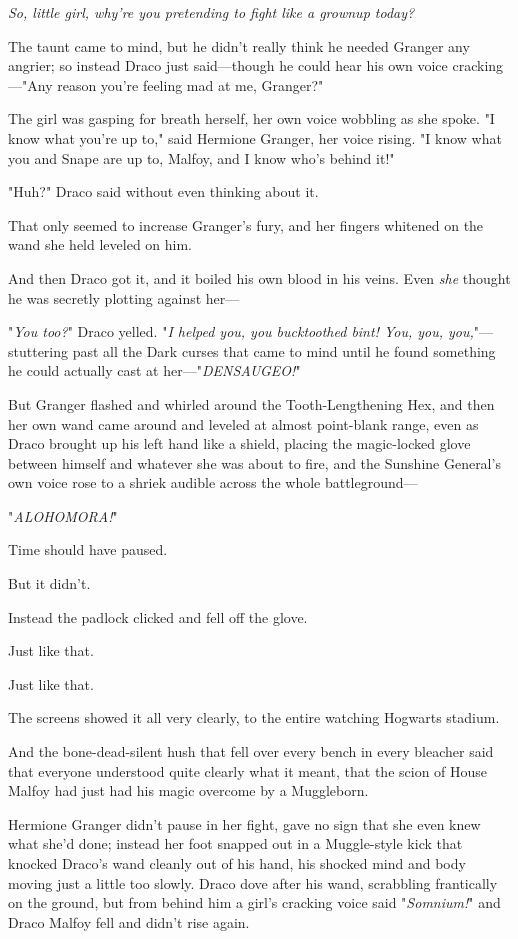 \emph{So, little girl, why're you pretending to fight like a grownup today?}

The taunt came to mind, but he didn't really think he needed Granger any
angrier; so instead Draco just said---though he could hear his own voice
cracking---"Any reason you're feeling mad at me, Granger?"

The girl was gasping for breath herself, her own voice wobbling as she spoke.
"I know what you're up to," said Hermione Granger, her voice rising. "I know
what you and Snape are up to, Malfoy, and I know who's behind it!"

"Huh?" Draco said without even thinking about it.

That only seemed to increase Granger's fury, and her fingers whitened on the
wand she held leveled on him.

And then Draco got it, and it boiled his own blood in his veins. Even
\emph{she} thought he was secretly plotting against her---

"\emph{You too?}" Draco yelled. "\emph{I helped you, you bucktoothed bint! You,
you, you,}"--- stuttering past all the Dark curses that came to mind until he
found something he could actually cast at her---"\emph{DENSAUGEO!}"

But Granger flashed and whirled around the Tooth-Lengthening Hex, and then her
own wand came around and leveled at almost point-blank range, even as Draco
brought up his left hand like a shield, placing the magic-locked glove between
himself and whatever she was about to fire, and the Sunshine General's own
voice rose to a shriek audible across the whole battleground---

"\emph{ALOHOMORA!}"

Time should have paused.

But it didn't.

Instead the padlock clicked and fell off the glove.

Just like that.

Just like that.

The screens showed it all very clearly, to the entire watching Hogwarts stadium.

And the bone-dead-silent hush that fell over every bench in every bleacher said
that everyone understood quite clearly what it meant, that the scion of House
Malfoy had just had his magic overcome by a Muggleborn.

Hermione Granger didn't pause in her fight, gave no sign that she even knew
what she'd done; instead her foot snapped out in a Muggle-style kick that
knocked Draco's wand cleanly out of his hand, his shocked mind and body moving
just a little too slowly. Draco dove after his wand, scrabbling frantically on
the ground, but from behind him a girl's cracking voice said "\emph{Somnium!}"
and Draco Malfoy fell and didn't rise again.


